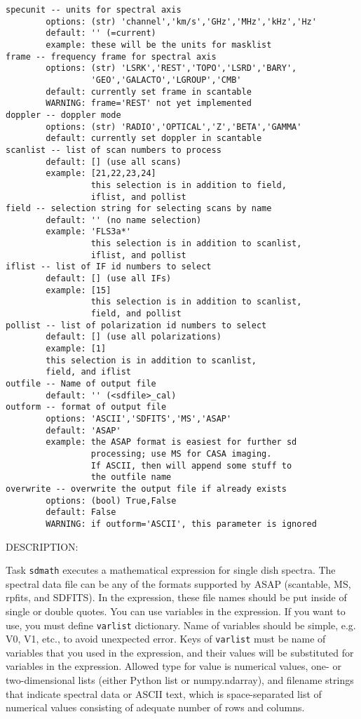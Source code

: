\begin{verbatim}
specunit -- units for spectral axis
        options: (str) 'channel','km/s','GHz','MHz','kHz','Hz'
        default: '' (=current)
        example: these will be the units for masklist
frame -- frequency frame for spectral axis
        options: (str) 'LSRK','REST','TOPO','LSRD','BARY',
                 'GEO','GALACTO','LGROUP','CMB'
        default: currently set frame in scantable
        WARNING: frame='REST' not yet implemented
doppler -- doppler mode
        options: (str) 'RADIO','OPTICAL','Z','BETA','GAMMA'
        default: currently set doppler in scantable
scanlist -- list of scan numbers to process
        default: [] (use all scans)
        example: [21,22,23,24]
                 this selection is in addition to field,
                 iflist, and pollist
field -- selection string for selecting scans by name
        default: '' (no name selection)
        example: 'FLS3a*'
                 this selection is in addition to scanlist,
                 iflist, and pollist
iflist -- list of IF id numbers to select
        default: [] (use all IFs)
        example: [15]
                 this selection is in addition to scanlist,
                 field, and pollist
pollist -- list of polarization id numbers to select
        default: [] (use all polarizations)
        example: [1]
        this selection is in addition to scanlist,
        field, and iflist
outfile -- Name of output file
        default: '' (<sdfile>_cal)
outform -- format of output file
        options: 'ASCII','SDFITS','MS','ASAP'
        default: 'ASAP'
        example: the ASAP format is easiest for further sd
                 processing; use MS for CASA imaging.
                 If ASCII, then will append some stuff to
                 the outfile name
overwrite -- overwrite the output file if already exists
        options: (bool) True,False
        default: False
        WARNING: if outform='ASCII', this parameter is ignored
\end{verbatim}

     DESCRIPTION:

     Task {\tt sdmath} executes a mathematical expression for single dish spectra.
     The spectral data file can be any of the formats supported by
     ASAP (scantable, MS, rpfits, and SDFITS). In the expression, 
     these file names should be put inside of single or double quotes.
     You can use variables in the expression. If you want to use, you must
     define {\tt varlist} dictionary. Name of variables should be simple, e.g.
     V0, V1, etc., to avoid unexpected error. Keys of {\tt varlist} must be name
     of variables that you used in the expression, and their values will
     be substituted for variables in the expression. Allowed type for value
     is numerical values, one- or two-dimensional lists (either Python list
     or numpy.ndarray), and filename strings that indicate spectral data
     or ASCII text, which is space-separated list of numerical values
     consisting of adequate number of rows and columns.
     
